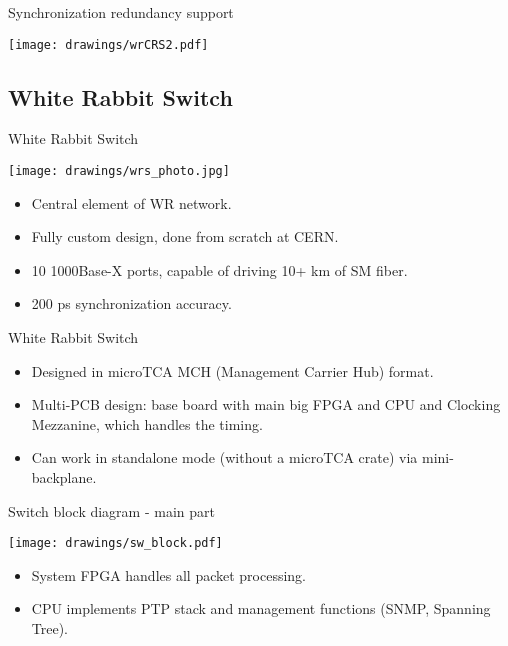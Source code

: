\documentclass[compress,red]{beamer}
\begin{document}
\begin{frame}{Synchronization redundancy support}

    \begin{center}
    \texttt{[image: drawings/wrCRS2.pdf]}
    \end{center}

\end{frame}


\subsection {White Rabbit Switch}


\begin{frame}{White Rabbit Switch}
\begin{center}
\texttt{[image: drawings/wrs\_photo.jpg]}
\end{center}
\begin{itemize}
\item Central element of WR network.
\item Fully custom design, done from scratch at CERN.
\item 10 1000Base-X ports, capable of driving 10+ km of SM fiber.
\item 200 ps synchronization accuracy.
\end{itemize}
\end{frame}

\begin{frame}{White Rabbit Switch}
\begin{itemize}
\item Designed in microTCA MCH (Management Carrier Hub) format.
\item Multi-PCB design: base board with main big FPGA and CPU and Clocking Mezzanine, which handles the timing.
\item Can work in standalone mode (without a microTCA crate) via mini-backplane.
\end{itemize}
\end{frame}

\begin{frame}{Switch block diagram - main part}
\begin{center}
\texttt{[image: drawings/sw\_block.pdf]}
\end{center}
\begin{itemize}
\item System FPGA handles all packet processing.
\item CPU implements PTP stack and management functions (SNMP, Spanning Tree).
\end{itemize}
\end{frame}
\end{document}
